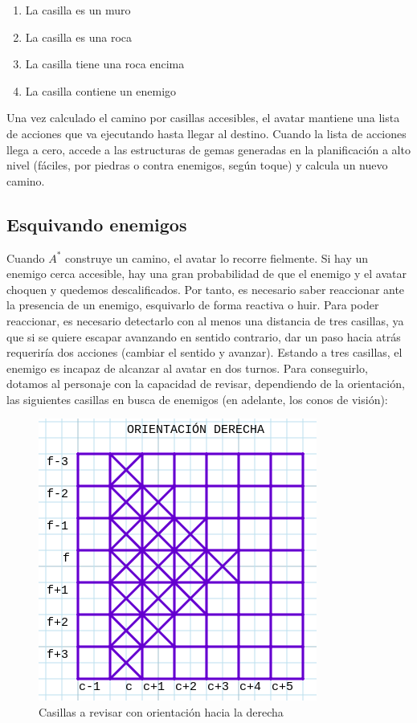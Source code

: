 \begin{enumerate}
	\item La casilla es un muro
	\item La casilla es una roca
	\item La casilla tiene una roca encima
	\item La casilla contiene un enemigo
\end{enumerate}

 Una vez calculado el camino por casillas accesibles, el avatar mantiene una lista de acciones que va ejecutando hasta llegar al destino. Cuando la lista de acciones llega a cero, accede a las estructuras de gemas generadas en la planificación a alto nivel (fáciles, por piedras o contra enemigos, según toque) y calcula un nuevo camino. 

\subsection{Esquivando enemigos}

Cuando $A^*$ construye un camino, el avatar lo recorre fielmente. Si hay un enemigo cerca accesible, hay una gran probabilidad de que el enemigo y el avatar choquen y quedemos descalificados. Por tanto, es necesario saber reaccionar ante la presencia de un enemigo, esquivarlo de forma reactiva o huir. Para poder reaccionar, es necesario detectarlo con al menos una distancia de tres casillas, ya que si se quiere escapar avanzando en sentido contrario, dar un paso hacia atrás requeriría dos acciones (cambiar el sentido y avanzar). Estando a tres casillas, el enemigo es incapaz de alcanzar al avatar en dos turnos. Para conseguirlo, dotamos al personaje con la capacidad de revisar, dependiendo de la orientación, las siguientes casillas en busca de enemigos (en adelante, los conos de visión):

\begin{figure}[H] %
	\centering
	\includegraphics[scale=0.6]{or-der.png}  %
	\caption{Casillas a revisar con orientación hacia la derecha} 
	\label{fig:orientación-dcha}
\end{figure}

